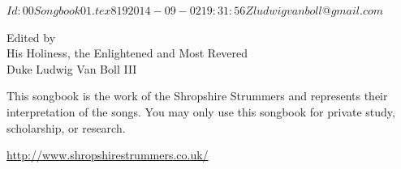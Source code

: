 \documentclass[12pt, a5paper, wordbk]{../SSSongbook}
\begin{document}
\svnInfo $Id: 00Songbook01.tex 819 2014-09-02 19:31:56Z ludwigvanboll@gmail.com $

\renewcommand\today{June 2011}
  {Edited by\\
    His Holiness, the Enlightened and Most Revered\\
    Duke Ludwig Van Boll III}

\ifChordBk
  \let\cleardoublepage\clearpage %
  \fancyhead[R,L]{}
  \tableofcontents %
  \vfil
  This songbook is the work of the Shropshire Strummers
  and represents their interpretation of the songs. 
  You may only use this songbook for private study, 
  scholarship, or research.\par
  \begin{center}
    \url{http://www.shropshirestrummers.co.uk/}
  \end{center}
  \pagebreak
\fi




\ifChordBk
  \printindex
\fi
\end{document}
